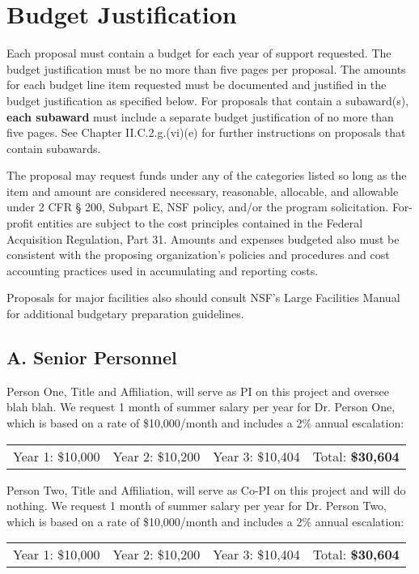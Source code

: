 \section*{Budget Justification}

\begin{pappg}
    Each proposal must contain a budget for each year of support requested.
    The budget justification must be no more than five pages per proposal.
    The amounts for each budget line item requested must be documented and
    justified in the budget justification as specified below. For proposals
    that contain a subaward(s), \textbf{each subaward} must include a
    separate budget justification of no more than five pages. See Chapter
    II.C.2.g.(vi)(e) for further instructions on proposals that contain
    subawards.

    The proposal may request funds under any of the categories listed so
    long as the item and amount are considered necessary, reasonable,
    allocable, and allowable under 2 CFR § 200, Subpart E, NSF policy,
    and/or the program solicitation. For-profit entities are subject to the
    cost principles contained in the Federal Acquisition Regulation, Part
    31. Amounts and expenses budgeted also must be consistent with the
    proposing organization's policies and procedures and cost accounting
    practices used in accumulating and reporting costs.

    Proposals for major facilities also should consult NSF's Large
    Facilities Manual for additional budgetary preparation guidelines.
\end{pappg}

\subsection*{A. Senior Personnel}

 Person One, Title and Affiliation, will serve as PI on this project and oversee blah blah. We request 1 month of summer salary per year for Dr. Person One, which is based on a rate of \$10,000/month and includes a 2\% annual escalation:
\newline
\begin{table}[h]
\begin{tabular}[c]{cccc}
Year 1: \$10,000 & Year 2: \$10,200 & Year 3: \$10,404 & Total: \textbf{\$30,604}
\end{tabular}
\end{table}
\newline
\newline
{} Person Two, Title and Affiliation, will serve as Co-PI on this project and will do nothing. We request 1 month of summer salary per year for Dr. Person Two, which is based on a rate of \$10,000/month and includes a 2\% annual escalation:
\newline
\begin{table}[h]
\begin{tabular}[c]{cccc}
Year 1: \$10,000 & Year 2: \$10,200 & Year 3: \$10,404 & Total: \textbf{\$30,604}
\end{tabular}
\end{table}

